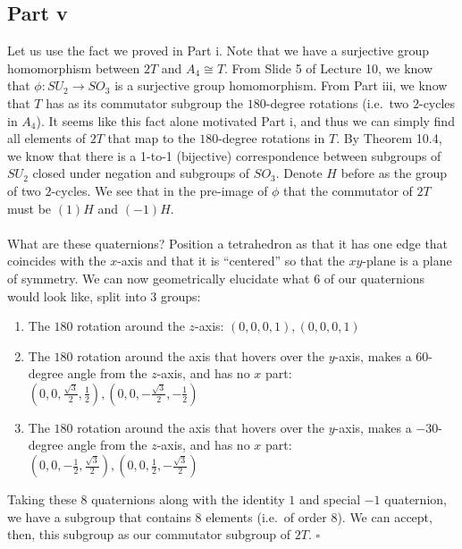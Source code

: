 \documentclass[letterpaper]{article}
\newcommand*{\QED}{\hfill\ensuremath{\square}}%
\begin{document}
\subsection{Part v}
\label{subs:8Partv}

Let us use the fact we proved in Part i.
Note that we have a surjective group homomorphism between $ 2T $ and $ A_4 \cong T $.
From Slide 5 of Lecture 10, we know that $ \phi : SU_2 \to SO_3 $ is a surjective group homomorphism.
From Part iii, we know that $ T $ has as its commutator subgroup the $ 180 $-degree rotations (i.e.\ two $ 2 $-cycles in $ A_4 $).
It seems like this fact alone motivated Part i, and thus we can simply find all elements of $ 2T $ that map to the $ 180 $-degree rotations in $ T $.
By Theorem 10.4, we know that there is a 1-to-1 (bijective) correspondence between subgroups of $ SU_2 $ closed under negation and subgroups of $ SO_3 $.
Denote $ H $ before as the group of two $ 2 $-cycles.
We see that in the pre-image of $ \phi $ that the commutator of $ 2T $ must be $ (1)H $ and $ (-1)H $.
\\ \\
What are these quaternions?
Position a tetrahedron as that it has one edge that coincides with the $ x $-axis and that it is ``centered'' so that the $ xy $-plane is a plane of symmetry.
We can now geometrically elucidate what $ 6 $ of our quaternions would look like, split into $ 3 $ groups:
\begin{enumerate}
    \item The $ 180 $ rotation around the $ z $-axis: $ (0, 0, 0, 1), (0, 0, 0, 1) $
    \item The $ 180 $ rotation around the axis that hovers over the $ y $-axis, makes a $ 60 $-degree angle from the $ z $-axis, and has no $ x $ part: $ (0, 0, \frac{\sqrt{3}}{2}, \frac{1}{2}), (0, 0, -\frac{\sqrt{3}}{2}, -\frac{1}{2}) $
    \item The $ 180 $ rotation around the axis that hovers over the $ y $-axis, makes a $ -30 $-degree angle from the $ z $-axis, and has no $ x $ part: $ (0, 0, -\frac{1}{2}, \frac{\sqrt{3}}{2}), (0, 0, \frac{1}{2}, -\frac{\sqrt{3}}{2}) $
\end{enumerate}

Taking these $ 8 $ quaternions along with the identity $ 1 $ and special $ -1 $ quaternion, we have a subgroup that contains $ 8 $ elements (i.e.\ of order $ 8 $).
We can accept, then, this subgroup as our commutator subgroup of $ 2T $.
\QED{}

\section{}
\label{sec:Question9}
\end{document}
